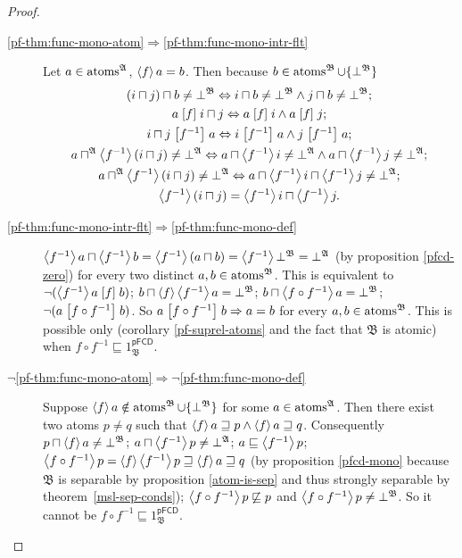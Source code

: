 \begin{proof}
~
\begin{description}
\item [{\ref{pf-thm:func-mono-atom}$\Rightarrow$\ref{pf-thm:func-mono-intr-flt}}] Let
$a\in\operatorname{atoms}^{\mathfrak{A}}$, $\left\langle f\right\rangle a=b$. Then because $b\in\operatorname{atoms}^{\mathfrak{B}}\cup\{\bot^{\mathfrak{B}}\}$
\begin{gather*}
(i\sqcap j)\sqcap b\ne\bot^{\mathfrak{B}}\Leftrightarrow i\sqcap b\ne\bot^{\mathfrak{B}}\land j\sqcap b\ne\bot^{\mathfrak{B}};\\
a\mathrel{\left[f\right]}i\sqcap j\Leftrightarrow a\mathrel{\left[f\right]}i\land a\mathrel{\left[f\right]}j;\\
i\sqcap j\mathrel{\left[f^{-1}\right]}a\Leftrightarrow i\mathrel{\left[f^{-1}\right]}a\land j\mathrel{\left[f^{-1}\right]}a;\\
a\sqcap^{\mathfrak{A}}\left\langle f^{-1}\right\rangle(i\sqcap j)\ne\bot^{\mathfrak{A}}\Leftrightarrow a\sqcap\left\langle f^{-1}\right\rangle i\ne\bot^{\mathfrak{A}}\land a\sqcap\left\langle f^{-1}\right\rangle j\ne\bot^{\mathfrak{A}};\\
a\sqcap^{\mathfrak{A}}\left\langle f^{-1}\right\rangle(i\sqcap j)\ne\bot^{\mathfrak{A}}\Leftrightarrow a\sqcap\left\langle f^{-1}\right\rangle i\sqcap\left\langle f^{-1}\right\rangle j\ne\bot^{\mathfrak{A}};\\
\left\langle f^{-1}\right\rangle(i\sqcap j)=\left\langle f^{-1}\right\rangle i\sqcap\left\langle f^{-1}\right\rangle j.
\end{gather*}

\item [{\ref{pf-thm:func-mono-intr-flt}$\Rightarrow$\ref{pf-thm:func-mono-def}}] $\left\langle f^{-1}\right\rangle a\sqcap\left\langle f^{-1}\right\rangle b=\left\langle f^{-1}\right\rangle(a\sqcap b)=\left\langle f^{-1}\right\rangle\bot^{\mathfrak{B}}=\bot^{\mathfrak{A}}$
(by proposition \ref{pfcd-zero})
for every two distinct $a,b\in\operatorname{atoms}^{\mathfrak{B}}$. This is equivalent
to $\lnot(\left\langle f^{-1}\right\rangle a\mathrel{\left[f\right]}b)$; $b\sqcap\left\langle f\right\rangle\left\langle f^{-1}\right\rangle a=\bot^{\mathfrak{B}}$;
$b\sqcap\left\langle f\circ f^{-1}\right\rangle a=\bot^{\mathfrak{B}}$; $\lnot(a\mathrel{\left[f\circ f^{-1}\right]}b)$.
So $a\mathrel{\left[f\circ f^{-1}\right]}b\Rightarrow a=b$ for every $a,b\in\operatorname{atoms}^{\mathfrak{B}}$.
This is possible only (corollary \ref{pf-suprel-atoms} and the fact
that $\mathfrak{B}$ is atomic) when $f\circ f^{-1}\sqsubseteq1_{\mathfrak{B}}^{\mathsf{pFCD}}$.
\item [{$\neg$\ref{pf-thm:func-mono-atom}$\Rightarrow\neg$\ref{pf-thm:func-mono-def}}] Suppose
$\left\langle f\right\rangle a\notin\operatorname{atoms}^{\mathfrak{B}}\cup\{\bot^{\mathfrak{B}}\}$
for some $a\in\operatorname{atoms}^{\mathfrak{A}}$. Then there exist two atoms
$p\neq q$ such that $\left\langle f\right\rangle a\sqsupseteq p\wedge\left\langle f\right\rangle a\sqsupseteq q$.
Consequently $p\sqcap\left\langle f\right\rangle a\neq\bot^{\mathfrak{B}}$; $a\sqcap\left\langle f^{-1}\right\rangle p\ne\bot^{\mathfrak{A}}$;
$a\sqsubseteq\left\langle f^{-1}\right\rangle p$; $\left\langle f\circ f^{-1}\right\rangle p=\left\langle f\right\rangle\left\langle f^{-1}\right\rangle p\sqsupseteq\left\langle f\right\rangle a\sqsupseteq q$
(by proposition \ref{pfcd-mono} because $\mathfrak{B}$ is separable
by proposition \ref{atom-is-sep} and thus strongly separable by theorem~\ref{msl-sep-conds});
$\left\langle f\circ f^{-1}\right\rangle p\not\sqsubseteq p$ and $\left\langle f\circ f^{-1}\right\rangle p\ne\bot^{\mathfrak{B}}$.
So it cannot be $f\circ f^{-1}\sqsubseteq1_{\mathfrak{B}}^{\mathsf{pFCD}}$.
\end{description}
\end{proof}
